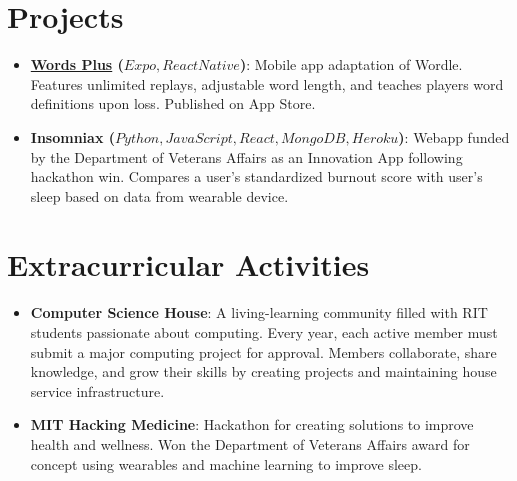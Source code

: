\documentclass[a4paper,20pt]{article}
\newcommand{\resumeItem}[2]{
  \item\small{
    \textbf{#1}{: #2 \vspace{-2pt}}
  }
}
\newcommand{\resumeSubItem}[2]{\resumeItem{#1}{#2}\vspace{-3pt}}
\newcommand{\resumeSubHeadingListStart}{\begin{itemize}[leftmargin=*]}
\newcommand{\resumeSubHeadingListEnd}{\end{itemize}}
\begin{document}
\vspace{-5pt}
\section{Projects}
\resumeSubHeadingListStart
\resumeSubItem{\href{https://apps.apple.com/us/app/words-puzzle/id1606643323}{Words Plus} (\(Expo, React Native\))}{Mobile app adaptation of Wordle. Features unlimited replays, adjustable word length, and teaches players word definitions upon loss. Published on App Store.}
\vspace{2pt}
\resumeSubItem{Insomniax (\(Python, JavaScript, React, MongoDB, Heroku\))}{Webapp funded by the Department of Veterans Affairs as an Innovation App following hackathon win. Compares a user's standardized burnout score with user's sleep based on data from wearable device.}
\vspace{2pt}
\resumeSubHeadingListEnd
\vspace{-5pt}
\vspace{-5pt}

\section{Extracurricular Activities}
  \resumeSubHeadingListStart
        \resumeSubItem{Computer Science House}{A living-learning community filled with RIT students passionate about computing. Every year, each active member
must submit a major computing project for approval. Members collaborate, share knowledge, and grow
their skills by creating projects and maintaining house service infrastructure.
}
        \vspace{2pt}
        \vspace{5pt}
        \resumeSubItem{MIT Hacking Medicine}{Hackathon for creating solutions to improve health and wellness. Won the Department of Veterans Affairs award for concept using wearables and machine learning to
improve sleep.}
\resumeSubHeadingListEnd
\end{document}

